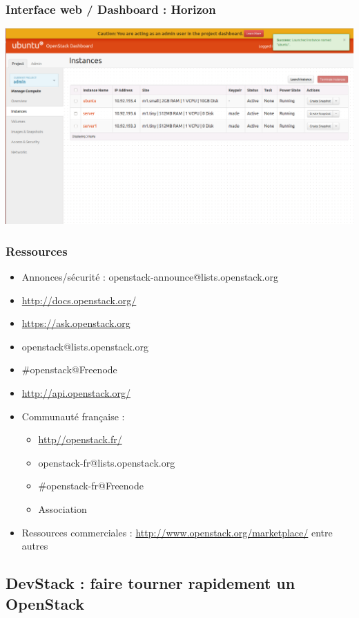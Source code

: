   \begin{frame}
    \frametitle{Interface web / Dashboard : Horizon}
    \includegraphics[width=\textwidth]{images/horizon.png}
  \end{frame}

  \begin{frame}
    \frametitle{Ressources}
    \begin{itemize}
      \item Annonces/sécurité : openstack-announce@lists.openstack.org
      \item \url{http://docs.openstack.org/}
      \item \url{https://ask.openstack.org}
      \item openstack@lists.openstack.org
      \item \#openstack@Freenode
      \item \url{http://api.openstack.org/}
      \item Communauté française :
      \begin{itemize}
        \item \url{http//openstack.fr/}
        \item openstack-fr@lists.openstack.org
        \item \#openstack-fr@Freenode
        \item Association
      \end{itemize}
    \item Ressources commerciales : \url{http://www.openstack.org/marketplace/} entre autres
    \end{itemize}
  \end{frame}

  \subsection[DevStack]{DevStack : faire tourner rapidement un OpenStack}

